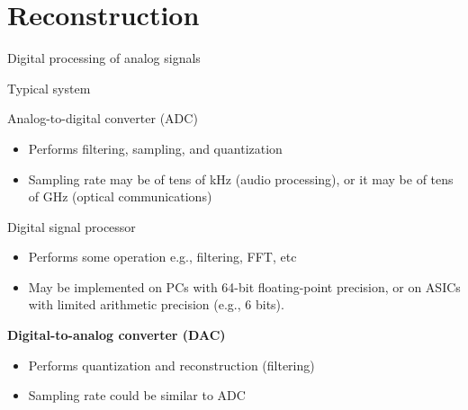 \documentclass[10pt]{beamer}
\begin{document}
\section{Reconstruction}
\begin{frame}{Digital processing of analog signals}
\begin{block}{Typical system}
	\vspace{-0.7cm}
	\begin{center}
		\resizebox{\linewidth}{!}{}
	\end{center}
\end{block}
\vspace{-0.5cm}
\begin{block}{Analog-to-digital converter (ADC)}
	\begin{itemize}
		\item Performs filtering, sampling, and quantization
		\item Sampling rate may be of tens of kHz (audio processing), or it may be of tens of GHz (optical communications)
	\end{itemize}
\end{block}
\vspace{-0.3cm}
\begin{block}{Digital signal processor}
	\begin{itemize} \itemsep 0pt
		\item Performs some operation e.g., filtering, FFT, etc
		\item May be implemented on PCs with 64-bit floating-point precision, or on ASICs with limited arithmetic precision (e.g., 6 bits).
	\end{itemize}
\end{block}
\vspace{-0.3cm}
\begin{block}{\textbf{Digital-to-analog converter (DAC)}}
	\begin{itemize}
		\item Performs quantization and reconstruction (filtering)
		\item Sampling rate could be similar to ADC
	\end{itemize}
\end{block}
\end{frame}
\end{document}
